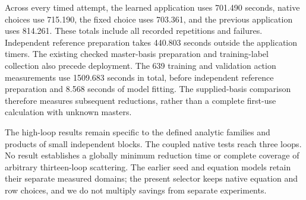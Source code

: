 Across every timed attempt, the learned application uses 701.490 seconds, native choices use 715.190, the fixed choice uses 703.361, and the previous application uses 814.261. These totals include all recorded repetitions and failures. Independent reference preparation takes 440.803 seconds outside the application timers. The existing checked master-basis preparation and training-label collection also precede deployment. The 639 training and validation action measurements use 1509.683 seconds in total, before independent reference preparation and 8.568 seconds of model fitting. The supplied-basis comparison therefore measures subsequent reductions, rather than a complete first-use calculation with unknown masters.

The high-loop results remain specific to the defined analytic families and products of small independent blocks. The coupled native tests reach three loops. No result establishes a globally minimum reduction time or complete coverage of arbitrary thirteen-loop scattering. The earlier seed and equation models retain their separate measured domains; the present selector keeps native equation and row choices, and we do not multiply savings from separate experiments.
